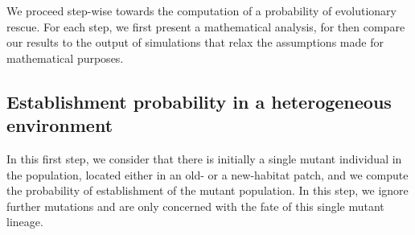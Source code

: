 \documentclass[11pt]{article}
\newcommand{\florence}[1]{\textcolor{purple}{(#1)}} %
\newcommand{\chg}[1]{\textcolor{change}{#1}}
\begin{document}

We proceed step-wise towards the computation of a probability of evolutionary rescue. For each step, we first present a mathematical analysis, for then compare our results to the output of simulations that relax the assumptions made for mathematical purposes. 


\subsection*{Establishment probability in a heterogeneous environment}\label{subsec:establishment}

In this first step, we consider that there is initially a single mutant individual in the population, located either in an old- or a new-habitat patch, and we compute the probability of establishment of the mutant population. In this step, we ignore further mutations and are only concerned with the fate of this single mutant lineage. 
\end{document}
